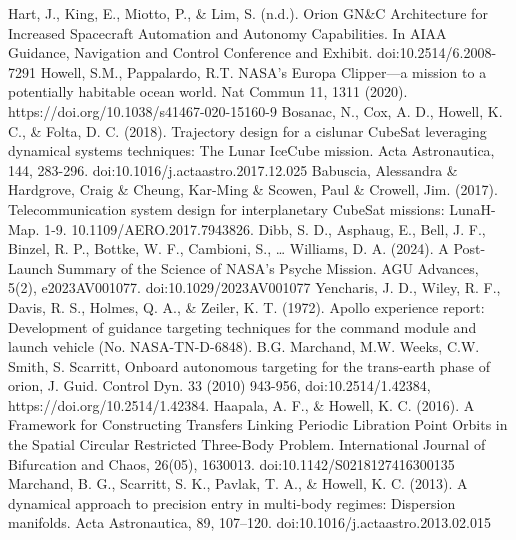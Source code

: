 \documentclass[conference]{IEEEtran}
\begin{document}






\begin{thebibliography}{00}

 Hart, J., King, E., Miotto, P., \& Lim, S. (n.d.). Orion GN\&C Architecture for Increased Spacecraft Automation and Autonomy Capabilities. In AIAA Guidance, Navigation and Control Conference and Exhibit. doi:10.2514/6.2008-7291
 Howell, S.M., Pappalardo, R.T. NASA's Europa Clipper—a mission to a potentially habitable ocean world. Nat Commun 11, 1311 (2020). https://doi.org/10.1038/s41467-020-15160-9
 Bosanac, N., Cox, A. D., Howell, K. C., \& Folta, D. C. (2018). Trajectory design for a cislunar CubeSat leveraging dynamical systems techniques: The Lunar IceCube mission. Acta Astronautica, 144, 283-296. doi:10.1016/j.actaastro.2017.12.025
 Babuscia, Alessandra \& Hardgrove, Craig \& Cheung, Kar-Ming \& Scowen, Paul \& Crowell, Jim. (2017). Telecommunication system design for interplanetary CubeSat missions: LunaH-Map. 1-9. 10.1109/AERO.2017.7943826.
 Dibb, S. D., Asphaug, E., Bell, J. F., Binzel, R. P., Bottke, W. F., Cambioni, S., … Williams, D. A. (2024). A Post-Launch Summary of the Science of NASA's Psyche Mission. AGU Advances, 5(2), e2023AV001077. doi:10.1029/2023AV001077
 Yencharis, J. D., Wiley, R. F., Davis, R. S., Holmes, Q. A., \& Zeiler, K. T. (1972). Apollo experience report: Development of guidance targeting techniques for the command module and launch vehicle (No. NASA-TN-D-6848).
 B.G. Marchand, M.W. Weeks, C.W. Smith, S. Scarritt, Onboard autonomous targeting for the trans-earth phase of orion, J. Guid. Control Dyn. 33 (2010) 943-956, doi:10.2514/1.42384, https://doi.org/10.2514/1.42384.
 Haapala, A. F., \& Howell, K. C. (2016). A Framework for Constructing Transfers Linking Periodic Libration Point Orbits in the Spatial Circular Restricted Three-Body Problem. International Journal of Bifurcation and Chaos, 26(05), 1630013. doi:10.1142/S0218127416300135
 Marchand, B. G., Scarritt, S. K., Pavlak, T. A., \& Howell, K. C. (2013). A dynamical approach to precision entry in multi-body regimes: Dispersion manifolds. Acta Astronautica, 89, 107–120. doi:10.1016/j.actaastro.2013.02.015

\end{thebibliography}
\end{document}
